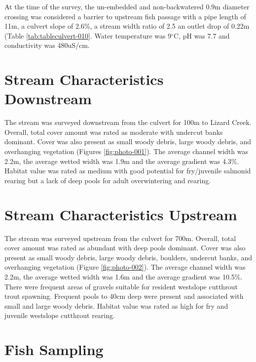 \documentclass[
]{book}
\begin{document}
At the time of the survey, the un-embedded and non-backwatered 0.9m diameter crossing was considered a barrier to upstream fish passage with a pipe length of 11m, a culvert slope of 2.6\%, a stream width ratio of 2.5 an outlet drop of 0.22m (Table \ref{tab:tableculvert-010}. Water temperature was 9\(^\circ\)C, pH was 7.7 and conductivity was 480uS/cm.

\hypertarget{stream-characteristics-downstream}{%
\section*{Stream Characteristics Downstream}\label{stream-characteristics-downstream}}

The stream was surveyed downstream from the culvert for 100m to Lizard Creek. Overall, total cover amount was rated as moderate with undercut banks dominant. Cover was also present as small woody debris, large woody debris, and overhanging vegetation (Figures \ref{fig:photo-001}). The average channel width was 2.2m, the average wetted width was 1.9m and the average gradient was 4.3\%. Habitat value was rated as medium with good potential for fry/juvenile salmonid rearing but a lack of deep pools for adult overwintering and rearing.

\hypertarget{stream-characteristics-upstream}{%
\section*{Stream Characteristics Upstream}\label{stream-characteristics-upstream}}

The stream was surveyed upstream from the culvert for 700m. Overall, total cover amount was rated as abundant with deep pools dominant. Cover was also present as small woody debris, large woody debris, boulders, undercut banks, and overhanging vegetation (Figure \ref{fig:photo-002}). The average channel width was 2.2m, the average wetted width was 1.6m and the average gradient was 10.5\%. There were frequent areas of gravels suitable for resident westslope cutthrout trout spawning. Frequent pools to 40cm deep were present and associated with small and large woody debris. Habitat value was rated as high for fry and juvenile westslope cutthrout rearing.

\hypertarget{fish-sampling}{%
\section*{Fish Sampling}\label{fish-sampling}}
\end{document}
